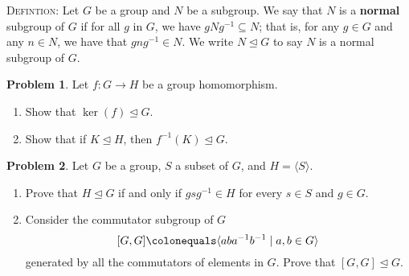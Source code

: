 \documentclass[11pt]{article}
\newcommand{\norm}{\trianglelefteq}
\theoremstyle{definition}
\newtheorem{problem}{Problem}
\begin{document}
\smallskip


\noindent \textsc{Defintion:} Let $G$ be a group and $N$ be a subgroup. We say that $N$ is a \textbf{normal} subgroup of $G$ if for all $g$ in $G$, we have $gNg^{-1} \subseteq N$; that is, for any $g\in G$ and any $n\in N$, we have that $gng^{-1}\in N$. We write $N \trianglelefteq G$ to say $N$ is a normal subgroup of $G$.

\begin{problem} Let $f: G\to H$ be a group homomorphism.
\begin{enumerate}[(4.1)]
\item Show that $\ker(f) \trianglelefteq G$.
\item Show that if $K \trianglelefteq H$, then $f^{-1}(K) \trianglelefteq G$.
\end{enumerate}
\end{problem}

\smallskip

\begin{problem}
Let $G$ be a group, $S$ a subset of $G$, and $H=\langle S \rangle$.  

\begin{enumerate}[(5.1)]
\item Prove that $H \norm G$ if and only if $gsg^{-1}\in H$ for every $s\in S$ and $g\in G$.

\item Consider the commutator subgroup of $G$
$$[G,G] \colonequals \langle aba^{-1}b^{-1}\mid a,b\in G \rangle$$ 
generated by all the commutators of elements in $G$.
Prove that $[G,G] \norm G$.


\end{enumerate}
\end{problem}
\end{document}
